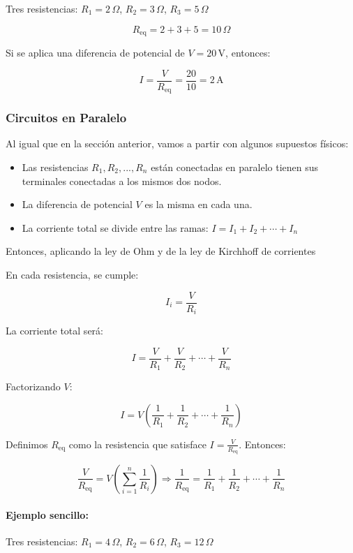 Tres resistencias: \( R_1 = 2 \, \Omega \), \( R_2 = 3 \, \Omega \), \( R_3 = 5 \, \Omega \)

\[
R_{\text{eq}} = 2 + 3 + 5 = 10 \, \Omega
\]

Si se aplica una diferencia de potencial de \( V = 20 \, \text{V} \), entonces:

\[
I = \frac{V}{R_{\text{eq}}} = \frac{20}{10} = 2 \, \text{A}
\]

\subsubsection{Circuitos en Paralelo}

Al igual que en la sección anterior, vamos a partir con algunos supuestos físicos:
\begin{itemize}
    \item Las resistencias \( R_1, R_2, ..., R_n \) están conectadas en paralelo tienen sus terminales conectadas a los mismos dos nodos.
    \item La diferencia de potencial \( V \) es la misma en cada una.
    \item La corriente total se divide entre las ramas: \( I = I_1 + I_2 + \cdots + I_n \)
\end{itemize}

Entonces, aplicando la ley de Ohm y de la ley de Kirchhoff de corrientes

En cada resistencia, se cumple:

\[
I_i = \frac{V}{R_i}
\]

La corriente total será:

\[
I = \frac{V}{R_1} + \frac{V}{R_2} + \cdots + \frac{V}{R_n}
\]

Factorizando \( V \):

\[
I = V \left( \frac{1}{R_1} + \frac{1}{R_2} + \cdots + \frac{1}{R_n} \right)
\]

Definimos \( R_{\text{eq}} \) como la resistencia que satisface \( I = \frac{V}{R_{\text{eq}}} \). Entonces:

\[
\frac{V}{R_{\text{eq}}} = V \left( \sum_{i=1}^{n} \frac{1}{R_i} \right)
\Rightarrow \boxed{\frac{1}{R_{\text{eq}}} = \frac{1}{R_1} + \frac{1}{R_2} + \cdots + \frac{1}{R_n}}
\]

\paragraph{Ejemplo sencillo:}

Tres resistencias: \( R_1 = 4 \, \Omega \), \( R_2 = 6 \, \Omega \), \( R_3 = 12 \, \Omega \)

